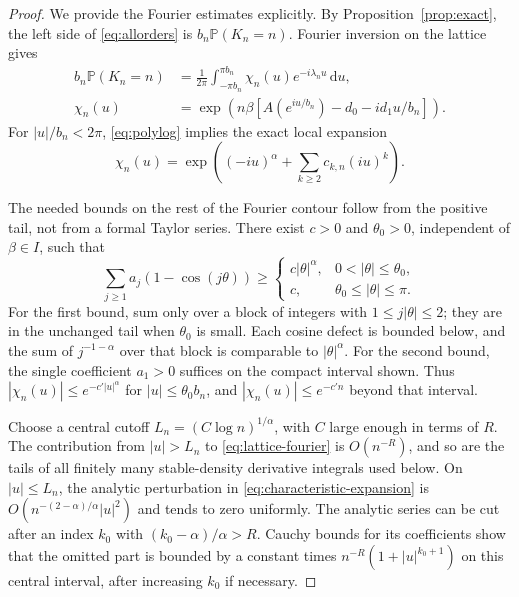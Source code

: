 \documentclass[11pt,a4paper]{article}
\numberwithin{equation}{section}
\theoremstyle{definition}
\theoremstyle{remark}
\newcommand{\Prob}{\mathbb P}
\newcommand{\dd}{\,\mathrm d}
\begin{document}
\begin{proof}
We provide the Fourier estimates explicitly. By
Proposition~\ref{prop:exact}, the left side of \eqref{eq:allorders} is
$b_n\Prob(K_n=n)$. Fourier inversion on the lattice gives
\begin{align}
 b_n\Prob(K_n=n)
 &=\frac1{2\pi}\int_{-\pi b_n}^{\pi b_n}
         \chi_n(u)e^{-i\lambda_nu}\dd u,\label{eq:lattice-fourier}\\
 \chi_n(u)
 &=\exp\left(n\beta\left[A(e^{iu/b_n})-d_0
                                    -id_1u/b_n\right]\right).\nonumber
\end{align}
For $|u|/b_n<2\pi$, \eqref{eq:polylog} implies the exact local expansion
\begin{equation}\label{eq:characteristic-expansion}
 \chi_n(u)=\exp\left((-iu)^\alpha
                     +\sum_{k\ge2}c_{k,n}(iu)^k\right).
\end{equation}

The needed bounds on the rest of the Fourier contour follow from the
positive tail, not from a formal Taylor series. There exist $c>0$ and
$\theta_0>0$, independent of $\beta\in I$, such that
\begin{equation}\label{eq:fourier-bound}
 \sum_{j\ge1}a_j(1-\cos(j\theta))\ge
 \begin{cases}
 c|\theta|^\alpha,&0<|\theta|\le\theta_0,\\
 c,&\theta_0\le|\theta|\le\pi.
 \end{cases}
\end{equation}
For the first bound, sum only over a block of integers with
$1\le j|\theta|\le2$; they are in the unchanged tail when $\theta_0$ is
small. Each cosine defect is bounded below, and the sum of $j^{-1-\alpha}$
over that block is comparable to $|\theta|^\alpha$. For the second bound,
the single coefficient $a_1>0$ suffices on the compact interval shown.
Thus $|\chi_n(u)|\le e^{-c'|u|^\alpha}$ for
$|u|\le\theta_0b_n$, and $|\chi_n(u)|\le e^{-c'n}$ beyond that interval.

Choose a central cutoff $L_n=(C\log n)^{1/\alpha}$, with $C$ large enough
in terms of $R$. The contribution from $|u|>L_n$ to
\eqref{eq:lattice-fourier} is $O(n^{-R})$, and so are the tails of all
finitely many stable-density derivative integrals used below.
On $|u|\le L_n$, the analytic perturbation in
\eqref{eq:characteristic-expansion} is
$O(n^{-(2-\alpha)/\alpha}|u|^2)$ and tends to zero uniformly.
The analytic series can be cut after an index $k_0$ with
$(k_0-\alpha)/\alpha>R$. Cauchy bounds for its coefficients show that
the omitted part is bounded by a constant times
$n^{-R}(1+|u|^{k_0+1})$ on this central interval, after increasing $k_0$
if necessary.


\end{proof}
\end{document}
